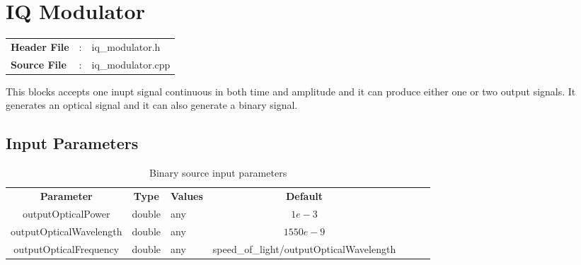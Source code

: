 \clearpage

\section{IQ Modulator}

\begin{tcolorbox}	
	\begin{tabular}{p{2.75cm} p{0.2cm} p{10.5cm}} 	
		\textbf{Header File}   &:& iq\_modulator.h \\
		\textbf{Source File}   &:& iq\_modulator.cpp \\
	\end{tabular}
\end{tcolorbox}

This blocks accepts one inupt signal continuous in both time and amplitude and it can produce either one or two output signals. It generates an optical signal and it can also generate a binary signal.

\subsection*{Input Parameters}

\begin{table}[h]
	\centering
	\begin{tabular}{|c|c|p{60mm}|c|ccp{60mm}}
		\cline{1-4}
		\textbf{Parameter} & \textbf{Type} & \textbf{Values} &   \textbf{Default}& \\ \cline{1-4}
		outputOpticalPower & double & any & $1e-3$ \\ \cline{1-4}
		outputOpticalWavelength & double & any & $1550e-9$ \\ \cline{1-4}
		outputOpticalFrequency & double & any & speed\_of\_light/outputOpticalWavelength \\ \cline{1-4}
	\end{tabular}
	\caption{Binary source input parameters}
	\label{table:iqmod_in_par}
\end{table}


